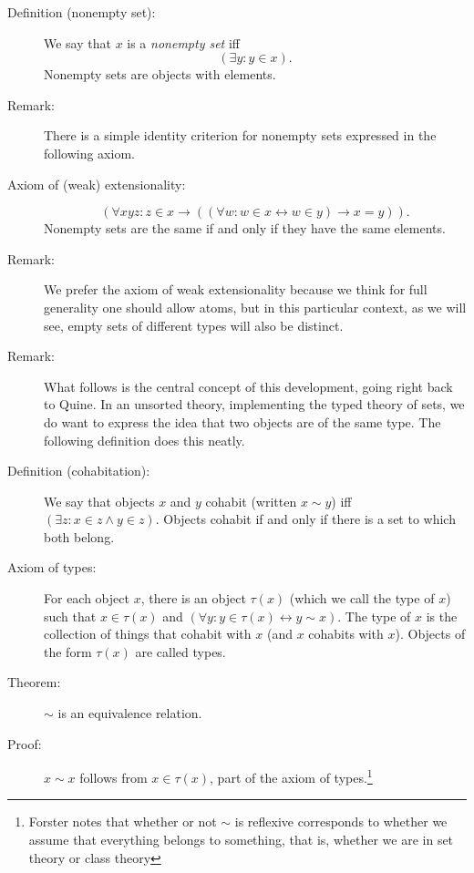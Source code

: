 \documentclass[12pt]{article}
\begin{document}
\begin{description}

\item[Definition (nonempty set):]  We say that $x$ is a {\em nonempty set\/} iff $$(\exists y:y \in x).$$ Nonempty sets are objects with elements.

\item[Remark:]  There is a simple identity criterion for nonempty sets expressed in the following axiom.

\item[Axiom of (weak) extensionality:]  $$(\forall xyz:z \in x \rightarrow ((\forall w:w \in x \leftrightarrow w \in y) \rightarrow x=y)).$$  Nonempty sets are the same if and only if they have the same elements.

\item[Remark:]  We prefer the axiom of weak extensionality because we think for full generality one should allow atoms, but in this particular context, as we will see, empty sets of different types will also be distinct.

\item[Remark:]  What follows is the central concept of this development, going right back to Quine.  In an unsorted theory, implementing the typed theory of sets, we do want to express the idea that two objects are of the same type.  The following definition does this neatly.

\item[Definition (cohabitation):]  We say that objects $x$ and $y$ cohabit (written $x \sim y$) iff $(\exists z:x \in z \wedge y \in z)$.  Objects cohabit if and only if there is a set to which both belong.

\item[Axiom of types:]  For each object $x$, there is an object $\tau(x)$ (which we call the type of $x$) such that $x \in \tau(x)$ and $(\forall y:y \in \tau(x) \leftrightarrow y \sim x)$.  The type of $x$ is the collection of things that cohabit with $x$ (and $x$ cohabits with $x$).  Objects of the form $\tau(x)$ are called types.

\item[Theorem:]  $\sim$ is an equivalence relation. 

\item[Proof:]  $x \sim x$ follows from $x \in \tau(x)$, part of the axiom of types.\footnote{Forster notes that whether or not $\sim$ is reflexive corresponds to whether we assume that everything belongs to something, that is, whether we are in set theory or class theory}


\end{description}
\end{document}
